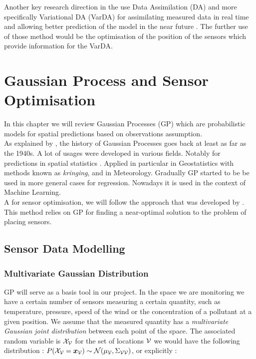 \documentclass[12pt,twoside]{report}
\begin{document}
Another key research direction in the use Data Assimilation (DA) and more specifically Variational DA (VarDA) for assimilating measured data in real time and allowing better prediction of the model in the near future \citep{arcucci_effective_2018}. The further use of those method would be the optimisation of the position of the sensors which provide information for the VarDA.


\section{Gaussian Process and Sensor Optimisation}

In this chapter we will review Gaussian Processes (GP) which are probabilistic models for spatial predictions based on observations assumption. \\ 

As explained by \citet[p.~29]{rasmussen_gaussian_2006}, the history of Gaussian Processes goes back at least as far as the 1940s. A lot of usages were developed in various fields. Notably for predictions in spatial statistics \citep{cressie_statistics_1991}.  Applied in particular in Geostatistics with methods known as \textit{kringing}, and in Meteorology. Gradually GP started to be be used in more general cases for regression. Nowadays it is used in the context of Machine Learning. \\


A for sensor optimisation, we will follow the approach that was developed by \citet{krause_near-optimal_2008}. This method relies on GP for finding a near-optimal solution to the problem of placing sensors. 


\subsection{Sensor Data Modelling}

\subsubsection{Multivariate Gaussian Distribution}

GP will serve as a basis tool in our project. In the space we are monitoring we have a certain number of sensors measuring a certain quantity, such as temperature, pressure, speed of the wind or the concentration of a pollutant at a given position. We assume that the measured quantity  has a \textit{multivariate Gaussian joint distribution} between each point of the space. The associated random variable is $\mathcal{X}_{\mathcal{V}}$ for the set of locations $\mathcal{V}$ we would have the following distribution : $P(\mathcal{X}_{\mathcal{V}} = {\boldsymbol{{x}}}_{\mathcal{V}}) \sim \mathcal{N}(\mu_{\mathcal{V}}, \Sigma_{\mathcal{V}\mathcal{V}}) $, or explicitly : 
\end{document}
